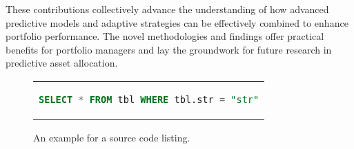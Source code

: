 These contributions collectively advance the understanding of how advanced predictive models and adaptive strategies can be effectively combined to enhance portfolio performance. The novel methodologies and findings offer practical benefits for portfolio managers and lay the groundwork for future research in predictive asset allocation.


\begin{figure}[htpb]
  \centering
  \begin{tabular}{c}
  \begin{lstlisting}[language=SQL]
    SELECT * FROM tbl WHERE tbl.str = "str"
  \end{lstlisting}
  \end{tabular}
  \caption[Example listing]{An example for a source code listing.}
\end{figure}
